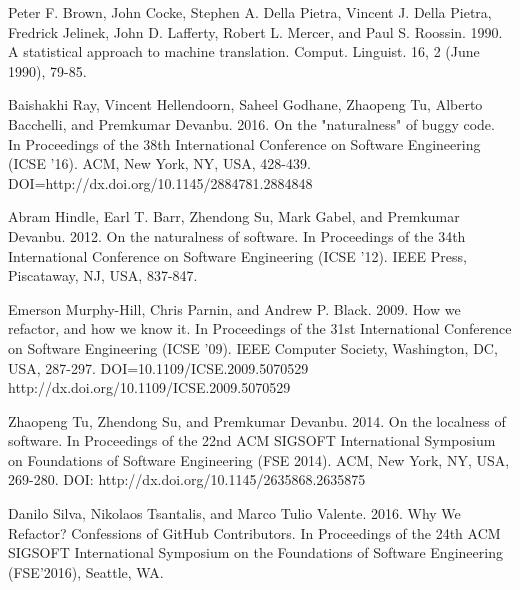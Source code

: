 \documentclass[conference]{IEEEtran}
\begin{document}
%
%
%
\begin{thebibliography}{}

Peter F. Brown, John Cocke, Stephen A. Della Pietra, Vincent J. Della Pietra, Fredrick Jelinek, John D. Lafferty, Robert L. Mercer, and Paul S. Roossin. 1990. A statistical approach to machine translation. Comput. Linguist. 16, 2 (June 1990), 79-85. 

Baishakhi Ray, Vincent Hellendoorn, Saheel Godhane, Zhaopeng Tu, Alberto Bacchelli, and Premkumar Devanbu. 2016. On the "naturalness" of buggy code. In Proceedings of the 38th International Conference on Software Engineering (ICSE '16). ACM, New York, NY, USA, 428-439. DOI=http://dx.doi.org/10.1145/2884781.2884848 

Abram Hindle, Earl T. Barr, Zhendong Su, Mark Gabel, and Premkumar Devanbu. 2012. On the naturalness of software. In Proceedings of the 34th International Conference on Software Engineering (ICSE '12). IEEE Press, Piscataway, NJ, USA, 837-847.

Emerson Murphy-Hill, Chris Parnin, and Andrew P. Black. 2009. How we refactor, and how we know it. In Proceedings of the 31st International Conference on Software Engineering (ICSE '09). IEEE Computer Society, Washington, DC, USA, 287-297. DOI=10.1109/ICSE.2009.5070529 http://dx.doi.org/10.1109/ICSE.2009.5070529

Zhaopeng Tu, Zhendong Su, and Premkumar Devanbu. 2014. On the localness of software. In Proceedings of the 22nd ACM SIGSOFT International Symposium on Foundations of Software Engineering (FSE 2014). ACM, New York, NY, USA, 269-280. DOI: http://dx.doi.org/10.1145/2635868.2635875

Danilo Silva, Nikolaos Tsantalis, and Marco Tulio Valente. 2016. Why We Refactor? Confessions of GitHub Contributors. In Proceedings of the 24th ACM SIGSOFT International Symposium on the Foundations of Software Engineering (FSE'2016), Seattle, WA.


\end{thebibliography}
\end{document}
